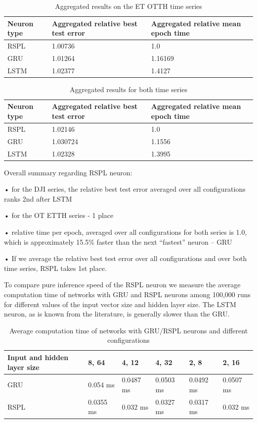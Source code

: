 \documentclass[sn-apa]{sn-jnl}%
\begin{document}
\begin{table}[H]
\caption{Aggregated results on the ET OTTH time series}
\begin{tabular}{ |p{2.2cm}|p{5cm}|p{5cm}|  }
 \hline
  Neuron type & Aggregated relative best test error & Aggregated relative mean epoch time \\
  \hline
 RSPL & 1.00736 & 1.0 \\
 \hline  
 GRU & 1.01264 & 1.16169 \\
 \hline 
 LSTM & 1.02377 & 1.4127 \\
 \hline
\end{tabular}
\end{table}

\begin{table}[H]
\caption{Aggregated results for both time series}
\begin{tabular}{ |p{2.2cm}|p{5cm}|p{5cm}|  }
 \hline
  Neuron type & Aggregated relative best test error & Aggregated relative mean epoch time \\
  \hline
 RSPL & 1.02146 & 1.0 \\
 \hline  
 GRU & 1.030724 & 1.1556 \\
 \hline 
 LSTM & 1.02328 & 1.3995 \\
 \hline
\end{tabular}
\end{table}

Overall summary regarding RSPL neuron: 

• for the DJI series, the relative best test error averaged over all configurations ranks 2nd after LSTM 

• for the OT ETTH series - 1 place 

• relative time per epoch, averaged over all configurations for both series is 1.0, which is approximately 15.5\% faster than the next “fastest” neuron – GRU 

• If we average the relative best test error over all configurations and over both time series, RSPL takes 1st place. 

To compare pure inference speed of the RSPL neuron we measure the average computation time of networks with GRU and RSPL neurons among 100,000 runs for different values of the input vector size and hidden layer size. The LSTM neuron, as is known from the literature, is generally slower than the GRU.

\begin{table}[H]
\caption{Average computation time of networks with GRU/RSPL neurons and different configurations}
\begin{tabular}{ |p{2cm}|p{2cm}|p{2cm}|p{2cm}|p{2cm}|p{2cm}|  }
 \hline
  Input and hidden layer size & 8, 64 & 4, 12 &  4, 32 & 2, 8 & 2, 16 \\
  \hline
 GRU & 0.054 ms & 0.0487 ms & 0.0503 ms & 0.0492 ms & 0.0507 ms \\
 \hline 
 RSPL & 0.0355 ms & 0.032 ms & 0.0327 ms & 0.0317 ms & 0.032 ms \\
 \hline
\end{tabular}
\end{table}
\end{document}
